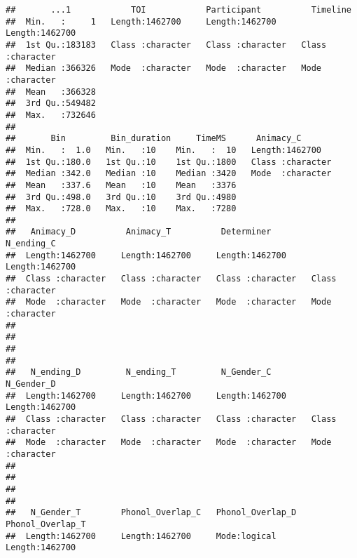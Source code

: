 \documentclass[
]{article}
\begin{document}
\begin{verbatim}
##       ...1            TOI            Participant          Timeline        
##  Min.   :     1   Length:1462700     Length:1462700     Length:1462700    
##  1st Qu.:183183   Class :character   Class :character   Class :character  
##  Median :366326   Mode  :character   Mode  :character   Mode  :character  
##  Mean   :366328                                                           
##  3rd Qu.:549482                                                           
##  Max.   :732646                                                           
##                                                                           
##       Bin         Bin_duration     TimeMS      Animacy_C        
##  Min.   :  1.0   Min.   :10    Min.   :  10   Length:1462700    
##  1st Qu.:180.0   1st Qu.:10    1st Qu.:1800   Class :character  
##  Median :342.0   Median :10    Median :3420   Mode  :character  
##  Mean   :337.6   Mean   :10    Mean   :3376                     
##  3rd Qu.:498.0   3rd Qu.:10    3rd Qu.:4980                     
##  Max.   :728.0   Max.   :10    Max.   :7280                     
##                                                                 
##   Animacy_D          Animacy_T          Determiner         N_ending_C       
##  Length:1462700     Length:1462700     Length:1462700     Length:1462700    
##  Class :character   Class :character   Class :character   Class :character  
##  Mode  :character   Mode  :character   Mode  :character   Mode  :character  
##                                                                             
##                                                                             
##                                                                             
##                                                                             
##   N_ending_D         N_ending_T         N_Gender_C         N_Gender_D       
##  Length:1462700     Length:1462700     Length:1462700     Length:1462700    
##  Class :character   Class :character   Class :character   Class :character  
##  Mode  :character   Mode  :character   Mode  :character   Mode  :character  
##                                                                             
##                                                                             
##                                                                             
##                                                                             
##   N_Gender_T        Phonol_Overlap_C   Phonol_Overlap_D Phonol_Overlap_T  
##  Length:1462700     Length:1462700     Mode:logical     Length:1462700    

\end{verbatim}
\end{document}
